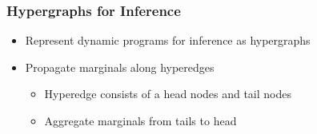 \documentclass{beamer}
\begin{document}
\begin{frame}
\frametitle{Hypergraphs for Inference}
\begin{itemize}
\item Represent dynamic programs for inference as hypergraphs
\vspace{1em}
\item Propagate marginals along hyperedges
    \begin{itemize}
    \item Hyperedge consists of a head nodes and tail nodes
    \item Aggregate marginals from tails to head
    \end{itemize}
\end{itemize}
\begin{columns}

\begin{column}{0.5\textwidth}
\begin{center}
\end{center}
\end{column}

\begin{column}{0.5\textwidth}
\begin{center}
\end{center}
\end{column}
\end{columns}
\end{frame}
\end{document}
